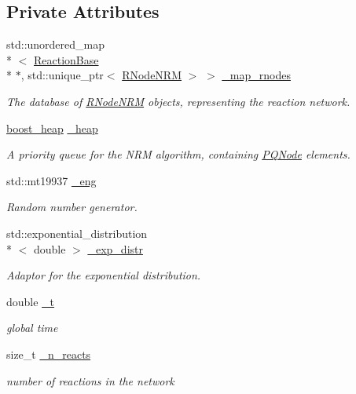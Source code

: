 \subsection*{Private Attributes}
\begin{DoxyCompactItemize}
\item 
std\-::unordered\-\_\-map\\*
$<$ \hyperlink{classchem_1_1ReactionBase}{Reaction\-Base} \\*
$\ast$, std\-::unique\-\_\-ptr$<$ \hyperlink{classchem_1_1RNodeNRM}{R\-Node\-N\-R\-M} $>$ $>$ \hyperlink{classchem_1_1ChemNRMImpl_a8eb526f8bc56b8aeeadca537004576db}{\-\_\-map\-\_\-rnodes}
\begin{DoxyCompactList}\small\item\em The database of \hyperlink{classchem_1_1RNodeNRM}{R\-Node\-N\-R\-M} objects, representing the reaction network. \end{DoxyCompactList}\item 
\hyperlink{namespacechem_ad3c7e19583b71f442e2d969972ed21f9}{boost\-\_\-heap} \hyperlink{classchem_1_1ChemNRMImpl_af2063c9b768c13ac541886947c567c1f}{\-\_\-heap}
\begin{DoxyCompactList}\small\item\em A priority queue for the N\-R\-M algorithm, containing \hyperlink{classchem_1_1PQNode}{P\-Q\-Node} elements. \end{DoxyCompactList}\item 
std\-::mt19937 \hyperlink{classchem_1_1ChemNRMImpl_ad0dce1073a3c37dd21c6523a81dd18e6}{\-\_\-eng}
\begin{DoxyCompactList}\small\item\em Random number generator. \end{DoxyCompactList}\item 
std\-::exponential\-\_\-distribution\\*
$<$ double $>$ \hyperlink{classchem_1_1ChemNRMImpl_ac817f5c731ea5522ea661a9e6c978d6a}{\-\_\-exp\-\_\-distr}
\begin{DoxyCompactList}\small\item\em Adaptor for the exponential distribution. \end{DoxyCompactList}\item 
double \hyperlink{classchem_1_1ChemNRMImpl_a1b14f424d72d3c5b0aafe31d7b7c4f82}{\-\_\-t}
\begin{DoxyCompactList}\small\item\em global time \end{DoxyCompactList}\item 
size\-\_\-t \hyperlink{classchem_1_1ChemNRMImpl_a7e53992b28e926d1a19f3fd7dea171c3}{\-\_\-n\-\_\-reacts}
\begin{DoxyCompactList}\small\item\em number of reactions in the network \end{DoxyCompactList}\end{DoxyCompactItemize}


